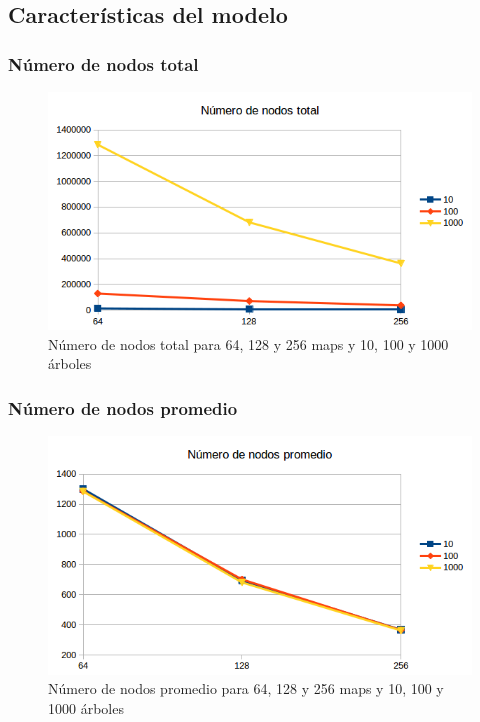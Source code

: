 \subsection{Características del modelo}

\subsubsection{Número de nodos total}

\begin{figure}[H]
	\centering
	\includegraphics[width=12cm]{img/nodos-total}
	\caption{Número de nodos total para 64, 128 y 256 maps y 10, 100 y 1000 árboles}
	\label{fig:nodos-total}
\end{figure}

\subsubsection{Número de nodos promedio}

\begin{figure}[H]
	\centering
	\includegraphics[width=12cm]{img/nodos-promedio}
	\caption{Número de nodos promedio para 64, 128 y 256 maps y 10, 100 y 1000 árboles}
	\label{fig:nodos-promedio}
\end{figure}

